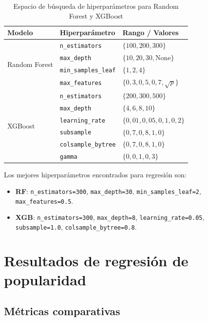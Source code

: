 \documentclass[12pt, a4paper, twoside]{book}
\theoremstyle{definition}
\begin{document}
\begin{table}[H]
\centering
\caption{Espacio de búsqueda de hiperparámetros para Random Forest y XGBoost}
\label{tab:hyperparam}
\small
\begin{tabular}{lll}
\toprule
\textbf{Modelo} & \textbf{Hiperparámetro} & \textbf{Rango / Valores} \\
\midrule
\multirow{4}{*}{Random Forest}
  & \texttt{n\_estimators}      & $\{100, 200, 300\}$ \\
  & \texttt{max\_depth}         & $\{10, 20, 30, \text{None}\}$ \\
  & \texttt{min\_samples\_leaf} & $\{1, 2, 4\}$ \\
  & \texttt{max\_features}      & $\{0{,}3, 0{,}5, 0{,}7, \sqrt{p}\}$ \\
\midrule
\multirow{6}{*}{XGBoost}
  & \texttt{n\_estimators}     & $\{200, 300, 500\}$ \\
  & \texttt{max\_depth}        & $\{4, 6, 8, 10\}$ \\
  & \texttt{learning\_rate}    & $\{0{,}01, 0{,}05, 0{,}1, 0{,}2\}$ \\
  & \texttt{subsample}         & $\{0{,}7, 0{,}8, 1{,}0\}$ \\
  & \texttt{colsample\_bytree} & $\{0{,}7, 0{,}8, 1{,}0\}$ \\
  & \texttt{gamma}             & $\{0, 0{,}1, 0{,}3\}$ \\
\bottomrule
\end{tabular}
\end{table}

Los mejores hiperparámetros encontrados para regresión son:
\begin{itemize}
  \item \textbf{RF}: \texttt{n\_estimators=300}, \texttt{max\_depth=30},
        \texttt{min\_samples\_leaf=2}, \texttt{max\_features=0.5}.
  \item \textbf{XGB}: \texttt{n\_estimators=300}, \texttt{max\_depth=8},
        \texttt{learning\_rate=0.05}, \texttt{subsample=1.0},
        \texttt{colsample\_bytree=0.8}.
\end{itemize}

\section{Resultados de regresión de popularidad}

\subsection{Métricas comparativas}
\end{document}
